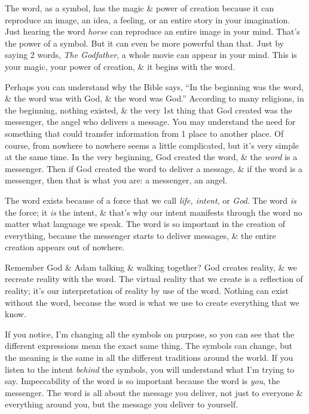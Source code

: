 \documentclass{article}
\numberwithin{equation}{section}
\begin{document}
The word, as a symbol, has the magic \& power of creation because it can reproduce an image, an idea, a feeling, or an entire story in your imagination. Just hearing the word \textit{horse} can reproduce an entire image in your mind. That's the power of a symbol. But it can even be more powerful than that. Just by saying 2 words, \textit{The Godfather}, a whole movie can appear in your mind. This is your magic, your power of creation, \& it begins with the word.

Perhaps you can understand why the Bible says, ``In the beginning was the word, \& the word was with God, \& the word was God.'' According to many religions, in the beginning, nothing existed, \& the very 1st thing that God created was the messenger, the angel who delivers a message. You may understand the need for something that could transfer information from 1 place to another place. Of course, from nowhere to nowhere seems a little complicated, but it's very simple at the same time. In the very beginning, God created the word, \& the \textit{word} is a messenger. Then if God created the word to deliver a message, \& if the word is a messenger, then that is what you are: a messenger, an angel.

The word exists because of a force that we call \textit{life, intent}, or \textit{God}. The word \textit{is} the force; it \textit{is} the intent, \& that's why our intent manifests through the word no matter what language we speak. The word is so important in the creation of everything, because the messenger starts to deliver messages, \& the entire creation appears out of nowhere.

Remember God \& Adam talking \& walking together? God creates reality, \& we recreate reality with the word. The virtual reality that we create is a reflection of reality; it's our interpretation of reality by use of the word. Nothing can exist without the word, because the word is what we use to create everything that we know.

If you notice, I'm changing all the symbols on purpose, so you can see that the different expressions mean the exact same thing. The symbols can change, but the meaning is the same in all the different traditions around the world. If you listen to the intent \textit{behind} the symbols, you will understand what I'm trying to say. Impeccability of the word is so important because the word is \textit{you}, the messenger. The word is all about the message you deliver, not just to everyone \& everything around you, but the message you deliver to yourself.
\end{document}
